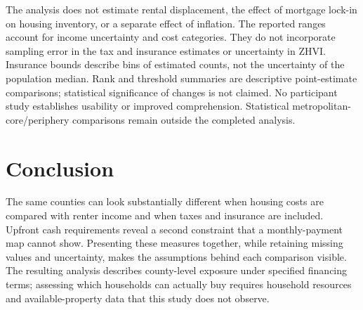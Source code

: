 \documentclass[conference,letterpaper]{IEEEtran}
\begin{document}
The analysis does not estimate rental displacement, the effect of mortgage lock-in on housing inventory, or a separate effect of inflation. The reported ranges account for income uncertainty and cost categories. They do not incorporate sampling error in the tax and insurance estimates or uncertainty in ZHVI. Insurance bounds describe bins of estimated counts, not the uncertainty of the population median. Rank and threshold summaries are descriptive point-estimate comparisons; statistical significance of changes is not claimed. No participant study establishes usability or improved comprehension. Statistical metropolitan-core/periphery comparisons remain outside the completed analysis.

\section{Conclusion}
The same counties can look substantially different when housing costs are compared with renter income and when taxes and insurance are included. Upfront cash requirements reveal a second constraint that a monthly-payment map cannot show. Presenting these measures together, while retaining missing values and uncertainty, makes the assumptions behind each comparison visible. The resulting analysis describes county-level exposure under specified financing terms; assessing which households can actually buy requires household resources and available-property data that this study does not observe.


\end{document}
